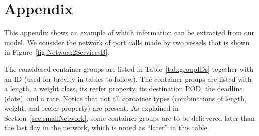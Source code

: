 \section{Appendix}
This appendix shows an example of which information can be extracted from our model. 
We consider the network of port calls made by two vessels that is shown in Figure~\ref{fig:Network2ServicesB}. 
  
The considered container groups are listed in Table~\ref{tab:groupIDs} together with an ID (used for brevity in tables to follow). The container groups are listed with a length, a weight class, its reefer property, its destination POD, the deadline (date), and a rate. Notice that not all container types (combinations of length, weight, and reefer-property) are present. As explained in Section~\ref{sec:smallNetwork}, some container groups are to be delievered later than the last day in the network, which is noted as ``later'' in this table. 

